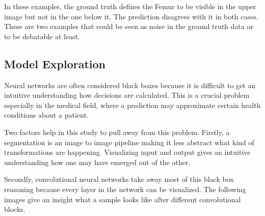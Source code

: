 In these examples, the ground truth defines the Femur to be visible in the upper image but not in the one below it. The prediction disagrees with it in both cases. These are two examples that could be seen as noise in the ground truth data or to be debatable at least.

\subsection{Model Exploration}

Neural networks are often considered black boxes because it is difficult to get an intuitive understanding how decisions are calculated. This is a crucial problem especially in the medical field, where a prediction may approximate certain health conditions about a patient.

Two factors help in this study to pull away from this problem. Firstly, a segmentation is an image to image pipeline making it less abstract what kind of transformations are happening. Visualizing input and output gives an intuitive understanding how one may have emerged out of the other.

Secondly, convolutional neural networks take away most of this black box reasoning \cite{Chollet2017} because every layer in the network can be visualized. The following images give an insight what a sample looks like after different convolutional blocks.

